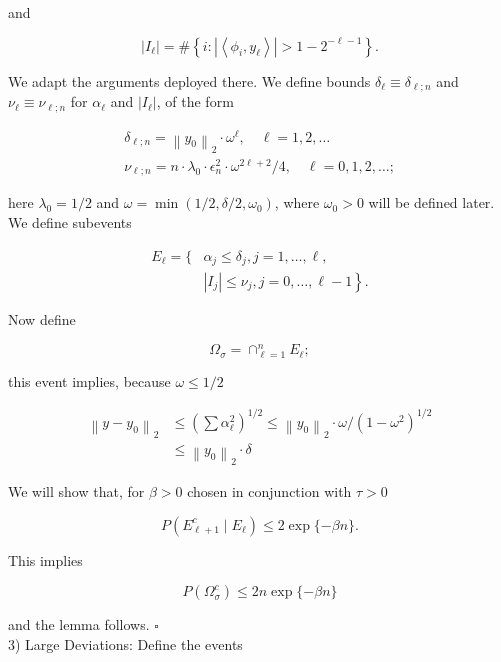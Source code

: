 \documentclass[10pt]{article}
\begin{document}
and

$$
\left|I_{\ell}\right|=\#\left\{i:\left|\left\langle\phi_{i}, y_{\ell}\right\rangle\right|>1-2^{-\ell-1}\right\} .
$$

We adapt the arguments deployed there. We define bounds $\delta_{\ell} \equiv \delta_{\ell ; n}$ and $\nu_{\ell} \equiv \nu_{\ell ; n}$ for $\alpha_{\ell}$ and $\left|I_{\ell}\right|$, of the form

$$
\begin{gathered}
\delta_{\ell ; n}=\left\|y_{0}\right\|_{2} \cdot \omega^{\ell}, \quad \ell=1,2, \ldots \\
\nu_{\ell ; n}=n \cdot \lambda_{0} \cdot \epsilon_{n}^{2} \cdot \omega^{2 \ell+2} / 4, \quad \ell=0,1,2, \ldots ;
\end{gathered}
$$

here $\lambda_{0}=1 / 2$ and $\omega=\min \left(1 / 2, \delta / 2, \omega_{0}\right)$, where $\omega_{0}>0$ will be defined later. We define subevents

$$
\begin{aligned}
E_{\ell}=\{ & \alpha_{j} \leq \delta_{j}, j=1, \ldots, \ell, \\
& \left.\left|I_{j}\right| \leq \nu_{j}, j=0, \ldots, \ell-1\right\} .
\end{aligned}
$$

Now define

$$
\Omega_{\sigma}=\cap_{\ell=1}^{n} E_{\ell} ;
$$

this event implies, because $\omega \leq 1 / 2$

$$
\begin{aligned}
\left\|y-y_{0}\right\|_{2} & \leq\left(\sum \alpha_{\ell}^{2}\right)^{1 / 2} \leq\left\|y_{0}\right\|_{2} \cdot \omega /\left(1-\omega^{2}\right)^{1 / 2} \\
& \leq\left\|y_{0}\right\|_{2} \cdot \delta
\end{aligned}
$$

We will show that, for $\beta>0$ chosen in conjunction with $\tau>0$


\begin{equation*}
P\left(E_{\ell+1}^{c} \mid E_{\ell}\right) \leq 2 \exp \{-\beta n\} . \tag{VII.12}
\end{equation*}


This implies

$$
P\left(\Omega_{\sigma}^{c}\right) \leq 2 n \exp \{-\beta n\}
$$

and the lemma follows. \(\square\)\\
3) Large Deviations: Define the events
\end{document}
